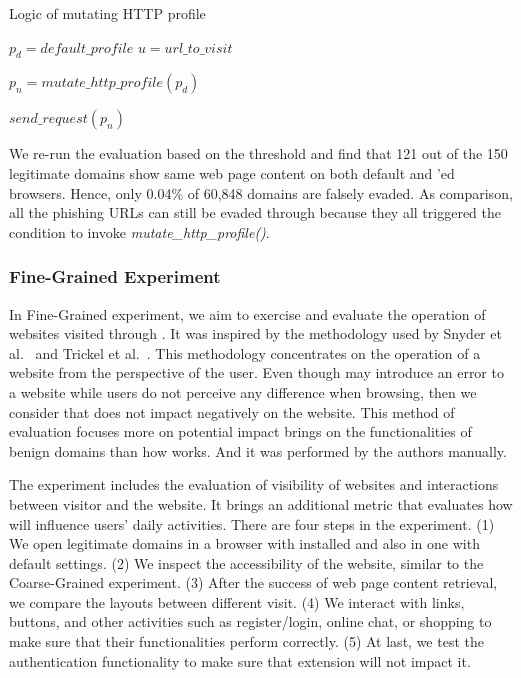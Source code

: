 \begin{algorithm}
  \caption{Logic of mutating HTTP profile}
\begin{algorithmic}[1]

\State $p_d = default\_profile$
\State $u = url\_to\_visit$

    \State $p_n = mutate\_http\_profile(p_d)$
\EndIf

\State $send\_request(p_n)$

\end{algorithmic}
\label{alg:mutatelogic}
\end{algorithm}

We re-run the evaluation based on the threshold and find that 121 out of the 150 legitimate domains show same web page content on both default and \spartacus'ed browsers.
Hence, only 0.04\% of 60,848 domains are falsely evaded.
As comparison, all the phishing URLs can still be evaded through \spartacus because they all triggered the condition to invoke \emph{mutate\_http\_profile()}.

\subsubsection{Fine-Grained Experiment}

In Fine-Grained experiment, we aim to exercise and evaluate the operation of websites visited through \spartacus.
It was inspired by the methodology used by Snyder et al.~\cite{snyder2017most} and Trickel et al.~\cite{trickel2019everyone}.
This methodology concentrates on the operation of a website from the perspective of the user.
Even though \spartacus may introduce an error to a website while users do not perceive any difference when browsing, then we consider that \spartacus does not impact negatively on the website.
This method of evaluation focuses more on potential impact \spartacus brings on the functionalities of benign domains than how \spartacus works.
And it was performed by the authors manually.

The experiment includes the evaluation of visibility of websites and interactions between visitor and the website.
It brings an additional metric that evaluates how \spartacus will influence users' daily activities.
There are four steps in the experiment.
(1) We open legitimate domains in a browser with \spartacus installed and also in one with default settings.
(2) We inspect the accessibility of the website, similar to the Coarse-Grained experiment.
(3) After the success of web page content retrieval, we compare the layouts between different visit.
(4) We interact with links, buttons, and other activities such as register/login, online chat, or shopping to make sure that their functionalities perform correctly.
(5) At last, we test the authentication functionality to make sure that \spartacus extension will not impact it.

